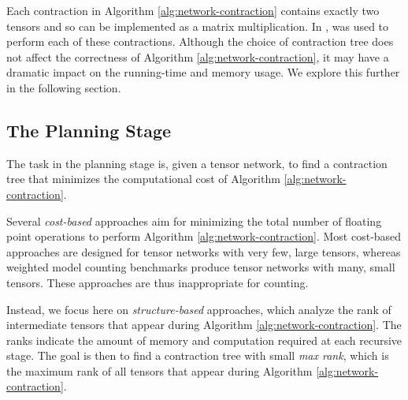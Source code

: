 Each contraction in Algorithm \ref{alg:network-contraction} contains exactly two tensors and so can be implemented as a matrix multiplication. In \cite{DDV19},  \cite{numpy} was used to perform each of these contractions. %
Although the choice of contraction tree does not affect the correctness of Algorithm \ref{alg:network-contraction}, it may have a dramatic impact on the running-time and memory usage. We explore this further in the following section.

\subsection{The Planning Stage}
\label{sec:algorithm:planning}
The task in the planning stage is, given a tensor network, to find a contraction tree that minimizes the computational cost of Algorithm \ref{alg:network-contraction}.

Several \emph{cost-based} approaches \cite{Hirata03,PHV14} aim for minimizing the total number of floating point operations to perform Algorithm \ref{alg:network-contraction}. Most cost-based approaches are designed for tensor networks with very few, large tensors, whereas weighted model counting benchmarks produce tensor networks with many, small tensors. These approaches are thus inappropriate for counting.

Instead, we focus here on \emph{structure-based} approaches, which analyze the rank of intermediate tensors that appear during Algorithm \ref{alg:network-contraction}. The ranks indicate the amount of memory and computation required at each recursive stage. The goal is then to find a contraction tree with small \emph{max rank}, which is the maximum rank of all tensors that appear during Algorithm \ref{alg:network-contraction}.


